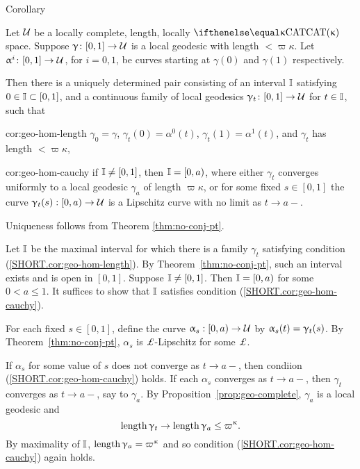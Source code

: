 \begin{thm}{Corollary}\label{cor:geo-hom}{\sloppy 
Let $\mathcal{U}$ be a locally complete, length, locally $\CAT\kappa$ space.
Suppose $\gamma\:[0,1]\to\spc{U}$ is a local geodesic with length $< \varpi\kappa$.  Let $\alpha^i\:[0,1]\to \spc{U}$, for $i=0,1$, be curves starting at $\gamma(0)$ and $\gamma(1)$ respectively.  

}

Then there is a uniquely determined pair consisting of an interval $\mathbb{I} $ satisfying $0\in \II\subset[0,1]$, and a continuous family of local geodesics $\gamma_t\:[0,1]\to \spc{U}$ for  $t\in \II$, such that  

\begin{subthm}{cor:geo-hom-length}
$\gamma_0=\gamma$, $\gamma_t(0)=\alpha^0(t)$, $\gamma_t(1)=\alpha^1(t)$, and $\gamma_t$ has length $< \varpi\kappa$,
\end{subthm} 

\begin{subthm}{cor:geo-hom-cauchy}
if $\mathbb{I}\ne [0,1]$, then $\mathbb{I}=[0, a)$, where either $\gamma_t$ converges uniformly to a local geodesic $\gamma_a$ of length $\varpi\kappa$, or 
for some fixed $s\in [0,1]$ the curve $\gamma_t(s):[0,a)\to\spc{U}$ is a Lipschitz curve with no limit 
as $t\to a-$.
\end{subthm}

\end{thm}


 Uniqueness follows from  Theorem \ref{thm:no-conj-pt}.

Let $\mathbb{I}$ be the maximal interval for which there is a family $\gamma_t$ satisfying condition (\ref{SHORT.cor:geo-hom-length}). 
By Theorem~\ref{thm:no-conj-pt}, such an interval exists and is open in $[0,1]$.  Suppose $\mathbb{I}\ne[0,1]$. Then  $\mathbb{I}=[0,a)$ for some $0<a\le 1$.  It suffices to show that $\mathbb{I}$ satisfies condition (\ref{SHORT.cor:geo-hom-cauchy}).

For each fixed $s\in [0,1]$, define the curve $\alpha_s:[0,a)\to\spc{U}$ by $\alpha_s(t)\z=\gamma_t(s)$. 
By Theorem~\ref{thm:no-conj-pt}, 
$\alpha_s$ is $ \Lip$-Lipschitz for some $\Lip$.  

If $\alpha_s$  for some value of $s$ does not converge as $t\to a-$, then condiion (\ref{SHORT.cor:geo-hom-cauchy}) holds.  If each $\alpha_s$  converges as $t\to a-$,  
 then $ \gamma_t$ converges as $t\to a-$, say to $\gamma_a$.
By  Proposition~\ref{prop:geo-complete}, $\gamma_a$ is a local geodesic and\[\length\gamma_t\to\length\gamma_a\le \varpi\kappa.\]
By maximality of $\mathbb{I}$, $\length\gamma_a=\varpi\kappa$ and so condition (\ref{SHORT.cor:geo-hom-cauchy}) again holds.
\qeds

